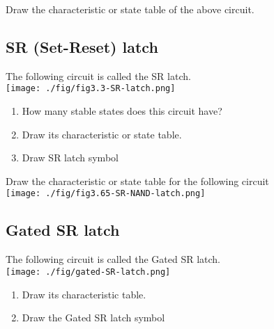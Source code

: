 \begin{definition}
  Draw the characteristic or state table of the above circuit. 
\end{definition}
\vspace{10em}



\subsection{SR (Set-Reset) latch \cite[Sec~3.2.1]{harris2022digital}}

\begin{definition}[SR latch]
  The following circuit is called the SR latch. \\
  \texttt{[image: ./fig/fig3.3-SR-latch.png]} \\
  \begin{enumerate}
    \item How many stable states does this circuit have?
    \item Draw its characteristic or state table.
    \item Draw SR latch symbol
  \end{enumerate}
\end{definition}
\vspace{20em}


\begin{prob}
Draw the characteristic or state table for the following circuit\\
  \texttt{[image: ./fig/fig3.65-SR-NAND-latch.png]} \\
\end{prob}

\subsection{Gated SR latch \cite[Sec~5.2]{stephen2022fundamentals}}

\begin{definition}
  The following circuit is called the Gated SR latch. \\
  \texttt{[image: ./fig/gated-SR-latch.png]} \\
  \begin{enumerate}
  \item Draw its characteristic table.
  \item Draw the Gated SR latch symbol
  \end{enumerate}
\end{definition}
\vspace{20em}

